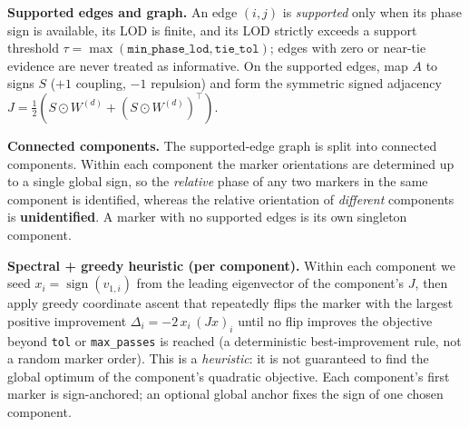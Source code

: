\documentclass[11pt]{article}
\begin{document}
\medskip
\noindent\textbf{Supported edges and graph.}
An edge \((i,j)\) is \emph{supported} only when its phase sign is available, its LOD is finite, and its
LOD strictly exceeds a support threshold \(\tau=\max(\texttt{min\_phase\_lod},\texttt{tie\_tol})\); edges
with zero or near-tie evidence are never treated as informative. On the supported edges, map \(A\) to
signs \(S\) (\(+1\) coupling, \(-1\) repulsion) and form the symmetric signed adjacency
\(J=\tfrac{1}{2}(S\odot W^{(d)}+(S\odot W^{(d)})^{\top})\).

\medskip
\noindent\textbf{Connected components.}
The supported-edge graph is split into connected components. Within each component the marker
orientations are determined up to a single global sign, so the \emph{relative} phase of any two
markers in the same component is identified, whereas the relative orientation of \emph{different}
components is \textbf{unidentified}. A marker with no supported edges is its own singleton component.

\medskip
\noindent\textbf{Spectral + greedy heuristic (per component).}
Within each component we seed \(x_i=\operatorname{sign}(v_{1,i})\) from the leading eigenvector of the
component's \(J\), then apply greedy coordinate ascent that repeatedly flips the marker with the
largest positive improvement \(\Delta_i=-2\,x_i\,(Jx)_i\) until no flip improves the objective beyond
\texttt{tol} or \texttt{max\_passes} is reached (a deterministic best-improvement rule, not a random
marker order). This is a \emph{heuristic}: it is not guaranteed to find the global optimum of the
component's quadratic objective. Each component's first marker is sign-anchored; an optional global
anchor fixes the sign of one chosen component.
\end{document}
